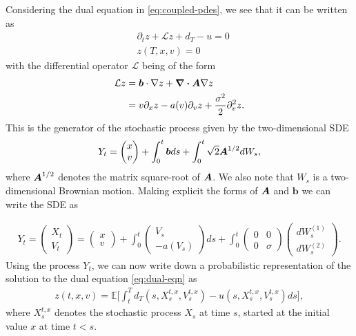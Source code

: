 \documentclass{article}  %
\begin{document}
Considering the dual equation in \autoref{eq:coupled-pdes}, we see that it can be written as
%
\begin{align} 
    \label{eq:dual-eqn}
    &\partial_t z + \mathcal{L} z + d_T - u = 0 \\
    &z(T,x,v) = 0
\end{align}
%
with the differential operator $\mathcal{L}$ being of the form
%
\begin{align} 
    \mathcal{L}z &= \boldsymbol{b}\cdot \nabla z + \div{\boldsymbol{A}\nabla z} \\
    &= v \partial_x z - a(v) \partial_v z + \frac{\sigma^2}{2}\partial^2_v z.
\end{align}
%
This is the generator of the stochastic process given by the two-dimensional SDE
%
\begin{align} 
    Y_t &= \begin{pmatrix}
        x\\
        v
    \end{pmatrix} 
    + \int_0^t \boldsymbol{b} ds + \int_0^t \sqrt{2}\boldsymbol{A}^{1/2} dW_s,\\
\end{align}
%
where $\boldsymbol{A}^{1/2}$ denotes the matrix square-root of $\boldsymbol{A}$. We also note that $W_s$ is a two-dimensional Brownian motion. Making explicit the forms of $\boldsymbol{A}$ and $\mathbf{b}$ we can write the SDE as

%
\begin{align}
    \label{eq:model-sde}
    Y_t = 
\begin{pmatrix}
    X_t\\
    V_t
\end{pmatrix}
= 
\begin{pmatrix}
    x\\
    v
\end{pmatrix}
+ \int_0^t 
\begin{pmatrix}
    V_s\\
    -a(V_s)
\end{pmatrix}
ds 
+ \int_0^t
\begin{pmatrix}
    0 & 0\\
    0 & \sigma 
\end{pmatrix}
\begin{pmatrix}
    dW_s^{(1)}\\
    dW_s^{(2)}
\end{pmatrix}.
\end{align}
%
Using the process $Y_t$, we can now write down a probabilistic representation of the solution to the dual equation \autoref{eq:dual-eqn} as
%
\begin{align}
    z(t,x,v) = \mathbb{E} \bigg[\int_t^T d_T(s,X_s^{t,x},V_s^{t,x}) - u(s,X_s^{t,x},V_s^{t,x}) ds \bigg],
\end{align}
%
where $X_s^{t,x}$ denotes the stochastic process $X_s$ at time $s$, started at the initial value $x$ at time $t<s$.
\end{document}

